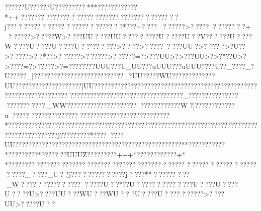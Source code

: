 {{{{{{{{{{{{{{{{{{{{{{{{{{{{{{{{{{{{{{{{{{{{{{{{{{{{{{{{{{{{{{{{{{{{{{{{{{{{{{{{{{{{{{{{{{{{{{{{{{{{{{{{{{{{{{{{{{{{{{{{{{{{{{{{{{{{{{{{{{{{{{{{{{{{{{{{{{{{{{{{{{{{{{{{{{{{{{{{{{{{{{{{{{{{{{{{{{{{{{{{{{{{{{{{{{{{{{{{{{{{{{{{{{{{{{{{{{{{{{{{{{{{{{{{{{{{{{{{{{{{{{{{{{{{{{{{{{{{{{{{{{{{{{{{{{{{{{{{{{{{{{{{{{{{{{{{{{{{{{{{{{{{{{{{{{{{{{{{{{{{{{{{{{{{{{{{{{{{{{{{{{{{{{{{{{{{{{{{{{{{{{{{{{{{{{{{{{{{{{{{{{{{{{{{{{{{{{{{{{{{{{{{{{{{{{{{{{{{{{{{{{{{{{{{{{{{{{{{{{{{{{{{{{{{{{{{{{{{{{{{{{{{{{{{{{{{{{{{{{{{{{{{{{{{{{{{{{{{{{{{{{{{{{{{{{{{{{{{{{{{{{{{{{{{{{{{{{{{{{{{{{{{{{{{{{{{{{{{{{{{{{{{{{{{{{{{{{{{{{{{{{{{{{{{{{{{{{{{{{{{{{{{??????U??????U?????????***????????????
*++??????????????????????????????????????????j?????????????????????????????*???=??????????>?????????????+
 ??????>?????W>????UU????UU????  ?????U?????U??V?? ?? ??U?? ??W?? ??U?? ??U?? ??U?? "????  ??>?? ??>?????????UU?>? ????>?U?? >?? ???>?? *??>??????>??????>??????=?>???UU>?>???UU>?>?*??U>?>? ???=?>?????>?=????????UUU???U_UU???uUUU???uUUU????U??_????_?U?????_]???????????????????????????_?UU?????WU?????????????UU????????????????????]UU????????????????????????????????????????????????????????????????????
??????????????????????????????????_??????????????????????????_WW???? ?????????????????????????????W?]????????????u?????
   ?????????????????????????????????????????*???????????????????????????????????????????????????????????????????????????????????????????j?????????*????  ????UU??????????????????????????????????????????????????**????? ??????  *?????????*?????   ??UUUZ?????????+++*????????????+*
*????????????????????????????????????????????????????????????????????????_????_U??j??????????????j????**?????????_W??  ??????????????????U??*??U?? ????? ????? ??U?? ??U?? ??U????U>????UU?? ?WU?? ?WU?? 
?U?? ??U??  ????????>????UU>?????U?? 
}}}}}}}}}}}}}}}}}}}}}}}}}}}}}}}}}}}}}}}}}}}}}}}}}}}}}}}}}}}}}}}}}}}}}}}}}}}}}}}}}}}}}}}}}}}}}}}}}}}}}}}}}}}}}}}}}}}}}}}}}}}}}}}}}}}}}}}}}}}}}}}}}}}}}}}}}}}}}}}}}}}}}}}}}}}}}}}}}}}}}}}}}}}}}}}}}}}}}}}}}}}}}}}}}}}}}}}}}}}}}}}}}}}}}}}}}}}}}}}}}}}}}}}}}}}}}}}}}}}}}}}}}}}}}}}}}}}}}}}}}}}}}}}}}}}}}}}}}}}}}}}}}}}}}}}}}}}}}}}}}}}}}}}}}}}}}}}}}}}}}}}}}}}}}}}}}}}}}}}}}}}}}}}}}}}}}}}}}}}}}}}}}}}}}}}}}}}}}}}}}}}}}}}}}}}}}}}}}}}}}}}}}}}}}}}}}}}}}}}}}}}}}}}}}}}}}}}}}}}}}}}}}}}}}}}}}}}}}}}}}}}}}}}}}}}}}}}}}}}}}}}}}}}}}}}}}}}}}}}}}}}}}}}}}}}}}}}}}}}}}}}}}}}}}}}}}}}}}}}}}}}}}}}}}}}}}}}}}}}}}}}}}}}}}}}}}}}}}}}}}}}}}}}}}}}}}}}}}}}}}}}}
